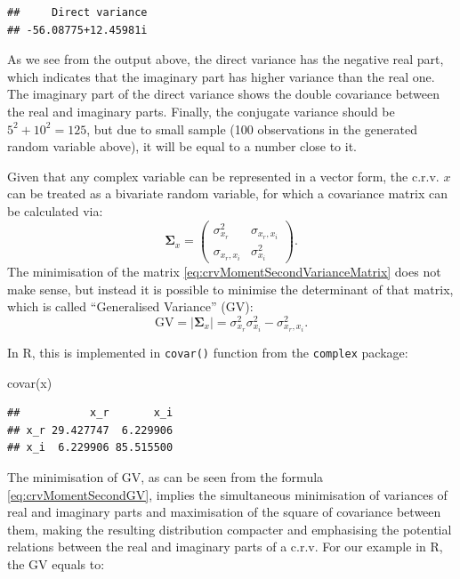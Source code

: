 \documentclass[
]{book}
\newenvironment{Shaded}{\begin{snugshade}}{\end{snugshade}}
\newcommand{\FunctionTok}[1]{\textcolor[rgb]{0.00,0.00,0.00}{#1}}
\newcommand{\NormalTok}[1]{#1}
\begin{document}
\begin{verbatim}
##     Direct variance 
## -56.08775+12.45981i
\end{verbatim}

As we see from the output above, the direct variance has the negative real part, which indicates that the imaginary part has higher variance than the real one. The imaginary part of the direct variance shows the double covariance between the real and imaginary parts. Finally, the conjugate variance should be \(5^2 + 10^2 = 125\), but due to small sample (100 observations in the generated random variable above), it will be equal to a number close to it.

Given that any complex variable can be represented in a vector form, the c.r.v. \(x\) can be treated as a bivariate random variable, for which a covariance matrix can be calculated via:
\begin{equation}
    \boldsymbol{\Sigma}_x = \begin{pmatrix} \sigma_{x_r}^2 & \sigma_{x_r, x_i} \\ \sigma_{x_r, x_i} & \sigma_{x_i}^2 \end{pmatrix} .
    \label{eq:crvMomentSecondVarianceMatrix}
\end{equation}
The minimisation of the matrix \eqref{eq:crvMomentSecondVarianceMatrix} does not make sense, but instead it is possible to minimise the determinant of that matrix, which is called ``Generalised Variance'' (GV):
\begin{equation}
    \mathrm{GV} = |\boldsymbol{\Sigma}_x| = \sigma_{x_r}^2 \sigma_{x_i}^2 - \sigma_{x_r, x_i}^2 .
    \label{eq:crvMomentSecondGV}
\end{equation}

In R, this is implemented in \texttt{covar()} function from the \texttt{complex} package:

\begin{Shaded}
\begin{Highlighting}[]
\FunctionTok{covar}\NormalTok{(x)}
\end{Highlighting}
\end{Shaded}

\begin{verbatim}
##           x_r       x_i
## x_r 29.427747  6.229906
## x_i  6.229906 85.515500
\end{verbatim}

The minimisation of GV, as can be seen from the formula \eqref{eq:crvMomentSecondGV}, implies the simultaneous minimisation of variances of real and imaginary parts and maximisation of the square of covariance between them, making the resulting distribution compacter and emphasising the potential relations between the real and imaginary parts of a c.r.v. For our example in R, the GV equals to:
\end{document}
